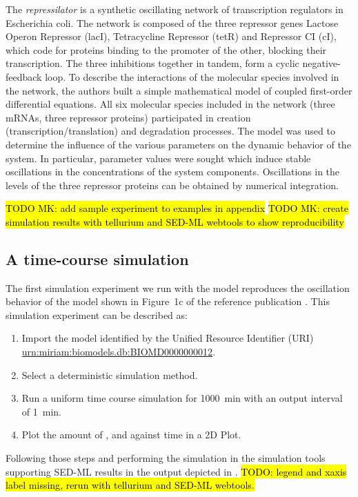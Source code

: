 The \emph{repressilator} is a synthetic oscillating network of transcription regulators in Escherichia coli. The network is composed of the three repressor genes Lactose Operon Repressor (lacI), Tetracycline Repressor (tetR) and Repressor CI (cI), which code for proteins binding to the promoter of the other, blocking their transcription. The three inhibitions together in tandem, form a cyclic negative-feedback loop. To describe the interactions of the molecular species involved in the network, the authors built a simple mathematical model of coupled first-order differential equations. All six molecular species included in the network (three mRNAs, three repressor proteins) participated in creation (transcription/translation) and degradation processes. The model was used to determine the influence of the various parameters on the dynamic behavior of the system. In particular, parameter values were sought which induce stable oscillations in the concentrations of the system components. Oscillations in the levels of the three repressor proteins can be obtained by numerical integration. 

\hl{TODO MK: add sample experiment to examples in appendix}
\hl{TODO MK: create simulation results with tellurium and SED-ML webtools to show reproducibility}

\subsection{A time-course simulation}
\label{sec:timecourse}
The first simulation experiment we run with the model reproduces the oscillation behavior of the model shown in Figure~1c of the reference publication \citep{Elowitz:2000}. This simulation experiment can be described as:

\begin{enumerate}
 	\item{Import the model identified by the Unified Resource Identifier (URI) \citep{Berners-Lee:2005}\\ 	\url{urn:miriam:biomodels.db:BIOMD0000000012}.}
 	\item {Select a deterministic simulation method.}
 	\item{Run a uniform time course simulation for 1000~min with an output interval of 1~min.}
 	\item{Plot the amount of ,  and  against time in a 2D Plot.}
 \end{enumerate}

Following those steps and performing the simulation in the simulation tools supporting SED-ML results in the output depicted in . \hl{TODO: legend and xaxis label missing, rerun with tellurium and SED-ML webtools.}

